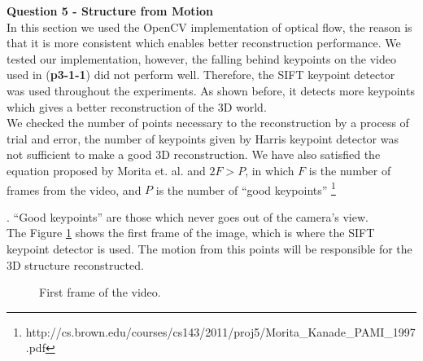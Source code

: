 \documentclass[12pt,a4paper]{article}
\newcommand\blfootnote[1]{%
	\begingroup
	\renewcommand\thefootnote{}\footnote{#1}%
	\addtocounter{footnote}{-1}%
	\endgroup
}
\begin{document}

\newpage

\textbf{\LARGE Question 5 - Structure from Motion} \\

In this section we used the OpenCV implementation of optical flow, the reason is that it is more consistent which enables better reconstruction performance. We tested our implementation, however, the falling behind keypoints on the video used in (\textbf{p3-1-1}) did not perform well. Therefore, the SIFT keypoint detector was used throughout the experiments. As shown before, it detects more keypoints which gives a better reconstruction of the 3D world. \\

We checked the number of points necessary to the reconstruction by a process of trial and error, the number of keypoints given by Harris keypoint detector was not sufficient to make a good 3D reconstruction. We have also satisfied the equation proposed by Morita et. al. and  $2F > P$, in which $F$ is the number of frames from the video, and $P$ is the number of ``good keypoints'' \blfootnote{http://cs.brown.edu/courses/cs143/2011/proj5/Morita\_Kanade\_PAMI\_1997.pdf}. ``Good keypoints'' are those which never goes out of the camera's view. \\

The Figure \ref{fig:3dframe} shows the first frame of the image, which is where the SIFT keypoint detector is used. The motion from this points will be responsible for the 3D structure reconstructed.

\begin{figure}[!h]
	\centering
	{
		\setlength{\fboxsep}{1pt}
		\setlength{\fboxrule}{1pt}
	}
	\caption{First frame of the video.}
	\label{fig:3dframe}
\end{figure}
\end{document}
